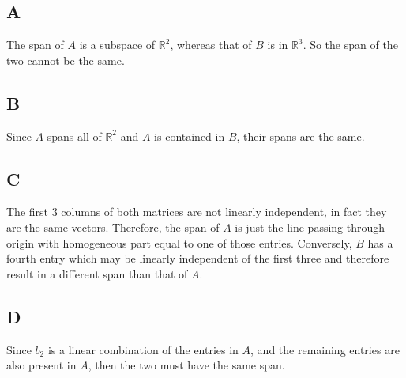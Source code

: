 \documentclass{report}
\begin{document}
\subsection*{A}

The span of $A$ is a subspace of \(\mathbb{R}^2\), whereas that of \(B\) is in \(\mathbb{R}^3\). So the span of the two cannot be the same.

\subsection*{B}

Since \(A\) spans all of \(\mathbb{R}^2\) and \(A\) is contained in \(B\), their spans are the same.

\subsection*{C}

The first 3 columns of both matrices are not linearly independent, in fact they are the same vectors. Therefore, the span of \(A\) is just the line passing through origin with homogeneous part equal to one of those entries. Conversely, \(B\) has a fourth entry which may be linearly independent of the first three and therefore result in a different span than that of \(A\).

\subsection*{D}

Since \(b_2\) is a linear combination of the entries in \(A\), and the remaining entries are also present in \(A\), then the two must have the same span.
\end{document}
